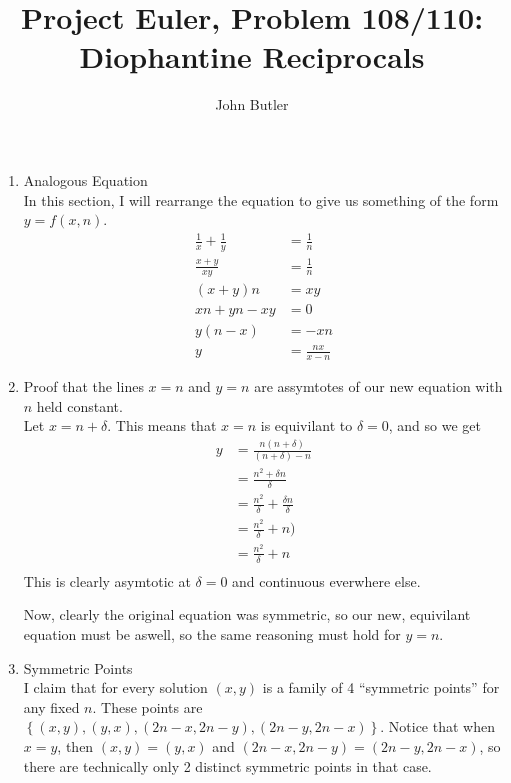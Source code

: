 \documentclass[11pt, oneside]{article}   	%
\title{Project Euler, Problem 108/110:\\\large{Diophantine Reciprocals}}
\author{John Butler}
\date{}							%
\begin{document}
\maketitle

\begin{enumerate}
  \item Analogous Equation\\
  In this section, I will rearrange the equation to give us something of the form $y=f(x,n)$.
  \begin{align*}
    \frac1x+\frac1y&=\frac1n\\
    \frac{x+y}{xy}&=\frac 1n\\
    (x+y)n&=xy\\
    xn+yn-xy&=0\\
    y(n-x)&=-xn\\
    y&=\frac{nx}{x-n}
  \end{align*}
  
  \item Proof that the lines $x=n$ and $y=n$ are assymtotes of our new equation with $n$ held constant.\\

    Let $x=n + \delta$. This means that $x = n$ is equivilant to $\delta = 0$, and so we get 
    \begin{align*}
      y &= \frac{n(n+\delta)}{(n + \delta) - n}\\
      &=\frac{n^2+\delta n}{\delta}\\
      &=\frac{n^2}\delta + \frac{\delta n} \delta\\
      &=\frac{n^2}\delta + n)\\
      &=\frac{n^2}\delta + n\\
    \end{align*}
    This is clearly asymtotic at $\delta=0$ and continuous everwhere else.

    Now, clearly the original equation was symmetric, so our new, equivilant equation must be aswell, so the same reasoning must hold for $y=n$.

  \item Symmetric Points\\
    I claim that for every solution $(x,y)$ is a family of 4 ``symmetric points'' for any fixed $n$.
    These points are $\left\{(x,y), (y,x), (2n-x,2n-y),(2n-y,2n-x) \right\}$.
    Notice that when $x=y$, then $(x,y)=(y,x)$ and $(2n-x,2n-y)=(2n-y,2n-x)$, so there are technically only 2 distinct symmetric points in that case.


\end{enumerate}
\end{document}
